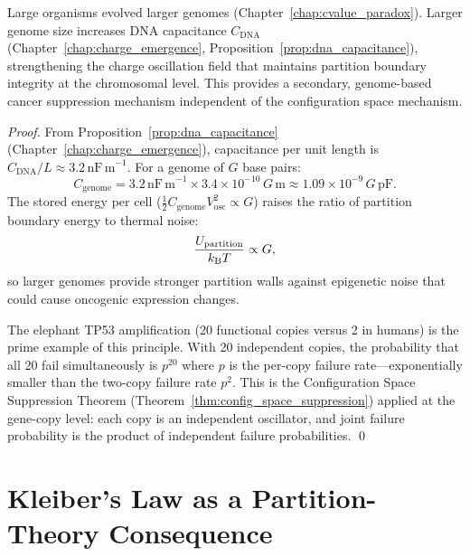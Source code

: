 \begin{proposition}
\label{prop:genome_cancer}
Large organisms evolved larger genomes (Chapter~\ref{chap:cvalue_paradox}).
Larger genome size increases DNA capacitance $C_{\mathrm{DNA}}$
(Chapter~\ref{chap:charge_emergence}, Proposition~\ref{prop:dna_capacitance}),
strengthening the charge oscillation field that maintains partition boundary
integrity at the chromosomal level. This provides a secondary, genome-based
cancer suppression mechanism independent of the configuration space mechanism.
\end{proposition}

\begin{proof}
From Proposition~\ref{prop:dna_capacitance} (Chapter~\ref{chap:charge_emergence}),
capacitance per unit length is $C_{\mathrm{DNA}}/L \approx 3.2\,\mathrm{nF\,m}^{-1}$.
For a genome of $G$ base pairs:
\begin{equation}
  C_{\mathrm{genome}} = 3.2\,\mathrm{nF\,m}^{-1} \times 3.4 \times 10^{-10}\,G\,\mathrm{m}
  \approx 1.09 \times 10^{-9}\,G\,\mathrm{pF}.
  \label{eq:genome_capacitance}
\end{equation}
The stored energy per cell ($\frac{1}{2}C_{\mathrm{genome}}V_{\mathrm{osc}}^2 \propto G$)
raises the ratio of partition boundary energy to thermal noise:
\begin{equation}
  \frac{U_{\mathrm{partition}}}{k_{\mathrm{B}} T} \propto G,
\end{equation}
so larger genomes provide stronger partition walls against epigenetic noise that
could cause oncogenic expression changes.

The elephant TP53 amplification (20 functional copies \citep{abegglen2015}
versus 2 in humans) is the prime example of this principle. With 20 independent
copies, the probability that all 20 fail simultaneously is $p^{20}$ where $p$
is the per-copy failure rate---exponentially smaller than the two-copy failure
rate $p^2$. This is the Configuration Space Suppression Theorem
(Theorem~\ref{thm:config_space_suppression}) applied at the gene-copy level:
each copy is an independent oscillator, and joint failure probability is the
product of independent failure probabilities. \qed
\end{proof}

\section{Kleiber's Law as a Partition-Theory Consequence}
\label{sec:kleiber}

